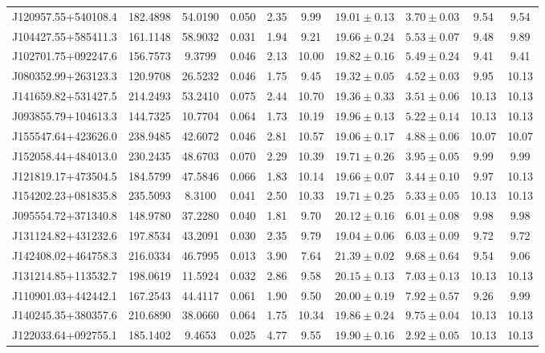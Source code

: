 \documentclass[fleqn,usenatbib]{mnras}
\begin{document}
\begin{table*}
\begin{tabular}{lccccccccc}
J120957.55+540108.4	&	182.4898	&	54.0190	&	0.050	&	2.35	&	9.99	&	$	19.01	\pm	0.13	$	&	$	3.70	\pm	0.03	$	&	9.54	&	9.54	\\
J104427.55+585411.3	&	161.1148	&	58.9032	&	0.031	&	1.94	&	9.21	&	$	19.66	\pm	0.24	$	&	$	5.53	\pm	0.07	$	&	9.48	&	9.89	\\
J102701.75+092247.6	&	156.7573	&	9.3799	&	0.046	&	2.13	&	10.00	&	$	19.82	\pm	0.16	$	&	$	5.49	\pm	0.24	$	&	9.41	&	9.41	\\
J080352.99+263123.3	&	120.9708	&	26.5232	&	0.046	&	1.75	&	9.45	&	$	19.32	\pm	0.05	$	&	$	4.52	\pm	0.03	$	&	9.95	&	10.13	\\
J141659.82+531427.5	&	214.2493	&	53.2410	&	0.075	&	2.44	&	10.70	&	$	19.36	\pm	0.33	$	&	$	3.51	\pm	0.06	$	&	10.13	&	10.13	\\
J093855.79+104613.3	&	144.7325	&	10.7704	&	0.064	&	1.73	&	10.19	&	$	19.96	\pm	0.13	$	&	$	5.22	\pm	0.14	$	&	10.13	&	10.13	\\
J155547.64+423626.0	&	238.9485	&	42.6072	&	0.046	&	2.81	&	10.57	&	$	19.06	\pm	0.17	$	&	$	4.88	\pm	0.06	$	&	10.07	&	10.07	\\
J152058.44+484013.0	&	230.2435	&	48.6703	&	0.070	&	2.29	&	10.39	&	$	19.71	\pm	0.26	$	&	$	3.95	\pm	0.05	$	&	9.99	&	9.99	\\
J121819.17+473504.5	&	184.5799	&	47.5846	&	0.066	&	1.83	&	10.14	&	$	19.66	\pm	0.07	$	&	$	3.44	\pm	0.10	$	&	9.97	&	10.13	\\
J154202.23+081835.8	&	235.5093	&	8.3100	&	0.041	&	2.50	&	10.33	&	$	19.71	\pm	0.25	$	&	$	5.33	\pm	0.05	$	&	10.13	&	10.13	\\
J095554.72+371340.8	&	148.9780	&	37.2280	&	0.040	&	1.81	&	9.70	&	$	20.12	\pm	0.16	$	&	$	6.01	\pm	0.08	$	&	9.98	&	9.98	\\
J131124.82+431232.6	&	197.8534	&	43.2091	&	0.030	&	2.35	&	9.79	&	$	19.04	\pm	0.06	$	&	$	6.03	\pm	0.09	$	&	9.72	&	9.72	\\
J142408.02+464758.3	&	216.0334	&	46.7995	&	0.013	&	3.90	&	7.64	&	$	21.39	\pm	0.02	$	&	$	9.68	\pm	0.64	$	&	9.54	&	9.06	\\
J131214.85+113532.7	&	198.0619	&	11.5924	&	0.032	&	2.86	&	9.58	&	$	20.15	\pm	0.13	$	&	$	7.03	\pm	0.13	$	&	10.13	&	10.13	\\
J110901.03+442442.1	&	167.2543	&	44.4117	&	0.061	&	1.90	&	9.50	&	$	20.00	\pm	0.19	$	&	$	7.92	\pm	0.57	$	&	9.26	&	9.99	\\
J140245.35+380357.6	&	210.6890	&	38.0660	&	0.064	&	1.75	&	10.34	&	$	19.86	\pm	0.24	$	&	$	9.75	\pm	0.04	$	&	10.13	&	10.13	\\
J122033.64+092755.1	&	185.1402	&	9.4653	&	0.025	&	4.77	&	9.55	&	$	19.90	\pm	0.16	$	&	$	2.92	\pm	0.05	$	&	10.13	&	10.13	\\

\end{tabular}
\end{table*}
\end{document}
